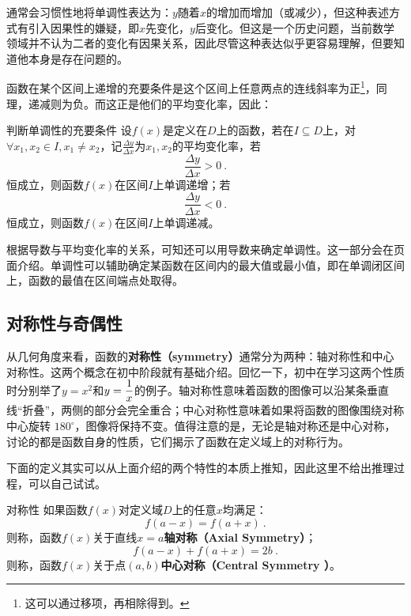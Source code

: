 通常会习惯性地将单调性表达为：$y$随着$x$的增加而增加（或减少），但这种表述方式有引入因果性的嫌疑，即$x$先变化，$y$后变化。但这是一个历史问题，当前数学领域并不认为二者的变化有因果关系，因此尽管这种表达似乎更容易理解，但要知道他本身是存在问题的。

函数在某个区间上递增的充要条件是这个区间上任意两点的连线斜率为正\footnote{这可以通过移项，再相除得到。}，同理，递减则为负。而这正是他们的平均变化率，因此：

\begin{theorem}{判断单调性的充要条件}
设$f(x)$是定义在$D$上的函数，若在$I\subseteq D$上，对$\forall x_1,x_2\in I,x_1\neq x_2$，记$\frac{\Delta y}{\Delta x}$为$x_1,x_2$的平均变化率，若
\begin{equation}
\frac{\Delta y}{\Delta x}>0~.
\end{equation}
恒成立，则函数$f(x)$在区间$I$上单调递增；若
\begin{equation}
\frac{\Delta y}{\Delta x}<0~.
\end{equation}
恒成立，则函数$f(x)$在区间$I$上单调递减。
\end{theorem}

根据导数与平均变化率的关系，可知还可以用导数来确定单调性。这一部分会在页面介绍。单调性可以辅助确定某函数在区间内的最大值或最小值，即在单调闭区间上，函数的最值在区间端点处取得。

\subsection{对称性与奇偶性}

从几何角度来看，函数的\textbf{对称性（symmetry）}通常分为两种：轴对称性和中心对称性。这两个概念在初中阶段就有基础介绍。回忆一下，初中在学习这两个性质时分别举了$y=x^2$和$\displaystyle y={1\over x}$的例子。轴对称性意味着函数的图像可以沿某条垂直线“折叠”，两侧的部分会完全重合；中心对称性意味着如果将函数的图像围绕对称中心旋转 $180^\circ$，图像将保持不变。值得注意的是，无论是轴对称还是中心对称，讨论的都是函数自身的性质，它们揭示了函数在定义域上的对称行为。

下面的定义其实可以从上面介绍的两个特性的本质上推知，因此这里不给出推理过程，可以自己试试。

\begin{definition}{对称性}
如果函数$f(x)$对定义域$D$上的任意$x$均满足：
\begin{equation}
f(a-x)=f(a+x)~.
\end{equation}
则称，函数$f(x)$关于直线$x=a$\textbf{轴对称（Axial Symmetry）}；
\begin{equation}
f(a-x)+f(a+x)=2b~.
\end{equation}
则称，函数$f(x)$关于点$(a,b)$\textbf{中心对称（Central Symmetry ）}。
\end{definition}

